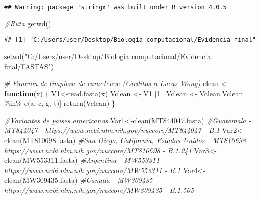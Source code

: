 \documentclass[
]{article}
\newenvironment{Shaded}{\begin{snugshade}}{\end{snugshade}}
\newcommand{\CommentTok}[1]{\textcolor[rgb]{0.56,0.35,0.01}{\textit{#1}}}
\newcommand{\ControlFlowTok}[1]{\textcolor[rgb]{0.13,0.29,0.53}{\textbf{#1}}}
\newcommand{\DecValTok}[1]{\textcolor[rgb]{0.00,0.00,0.81}{#1}}
\newcommand{\FunctionTok}[1]{\textcolor[rgb]{0.00,0.00,0.00}{#1}}
\newcommand{\NormalTok}[1]{#1}
\newcommand{\OtherTok}[1]{\textcolor[rgb]{0.56,0.35,0.01}{#1}}
\newcommand{\SpecialCharTok}[1]{\textcolor[rgb]{0.00,0.00,0.00}{#1}}
\newcommand{\StringTok}[1]{\textcolor[rgb]{0.31,0.60,0.02}{#1}}
\begin{document}
\begin{verbatim}
## Warning: package 'stringr' was built under R version 4.0.5
\end{verbatim}

\begin{Shaded}
\begin{Highlighting}[]
\CommentTok{\#Ruta}
\FunctionTok{getwd}\NormalTok{()}
\end{Highlighting}
\end{Shaded}

\begin{verbatim}
## [1] "C:/Users/user/Desktop/Biología computacional/Evidencia final"
\end{verbatim}

\begin{Shaded}
\begin{Highlighting}[]
\FunctionTok{setwd}\NormalTok{(}\StringTok{"C:/Users/user/Desktop/Biología computacional/Evidencia final/FASTAS"}\NormalTok{)}

\CommentTok{\# Funcion de limpieza de caracteres: (Creditos a Lucas Wong)}
\NormalTok{clean }\OtherTok{\textless{}{-}} \ControlFlowTok{function}\NormalTok{(x) \{}
\NormalTok{  V1}\OtherTok{\textless{}{-}}\FunctionTok{read.fasta}\NormalTok{(x)}
\NormalTok{  Vclean }\OtherTok{\textless{}{-}}\NormalTok{ V1[[}\DecValTok{1}\NormalTok{]]}
\NormalTok{  Vclean }\OtherTok{\textless{}{-}}\NormalTok{ Vclean[Vclean }\SpecialCharTok{\%in\%} \FunctionTok{c}\NormalTok{(}\StringTok{\textquotesingle{}a\textquotesingle{}}\NormalTok{, }\StringTok{\textquotesingle{}c\textquotesingle{}}\NormalTok{, }\StringTok{\textquotesingle{}g\textquotesingle{}}\NormalTok{, }\StringTok{\textquotesingle{}t\textquotesingle{}}\NormalTok{)]}
\FunctionTok{return}\NormalTok{(Vclean)}
\NormalTok{\}}

\CommentTok{\#Variantes de paises americanos}
\NormalTok{Var1}\OtherTok{\textless{}{-}}\FunctionTok{clean}\NormalTok{(}\StringTok{\textquotesingle{}MT844047.fasta\textquotesingle{}}\NormalTok{) }\CommentTok{\#Guatemala {-} MT844047 {-} https://www.ncbi.nlm.nih.gov/nuccore/MT844047 {-} B.1}
\NormalTok{Var2}\OtherTok{\textless{}{-}}\FunctionTok{clean}\NormalTok{(}\StringTok{\textquotesingle{}MT810698.fasta\textquotesingle{}}\NormalTok{) }\CommentTok{\#San Diego, California, Estados Unidos {-} MT810698 {-} https://www.ncbi.nlm.nih.gov/nuccore/MT810698 {-} B.1.241}
\NormalTok{Var3}\OtherTok{\textless{}{-}}\FunctionTok{clean}\NormalTok{(}\StringTok{\textquotesingle{}MW553311.fasta\textquotesingle{}}\NormalTok{) }\CommentTok{\#Argentina {-} MW553311 {-} https://www.ncbi.nlm.nih.gov/nuccore/MW553311 {-} B.1}
\NormalTok{Var4}\OtherTok{\textless{}{-}}\FunctionTok{clean}\NormalTok{(}\StringTok{\textquotesingle{}MW309435.fasta\textquotesingle{}}\NormalTok{) }\CommentTok{\#Canada {-} MW309435 {-} https://www.ncbi.nlm.nih.gov/nuccore/MW309435 {-} B.1.505}


\end{Highlighting}
\end{Shaded}
\end{document}

